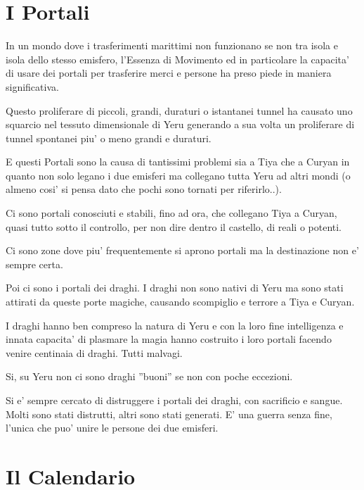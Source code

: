 \documentclass[a4paper,11pt,twoside,openany]{book}
\begin{document}
{		\pagebreak
		
		\section{I Portali}
		
		\label{i-portali}
		
		In un mondo dove i trasferimenti marittimi non funzionano se non tra isola e isola dello stesso emisfero, l'Essenza di Movimento ed in particolare la capacita' di usare dei portali per trasferire merci e persone ha preso piede in maniera significativa.
		
		Questo proliferare di piccoli, grandi, duraturi o istantanei tunnel ha causato uno squarcio nel tessuto dimensionale di Yeru generando a sua volta un proliferare di tunnel spontanei piu' o meno grandi e duraturi.
		
		E questi Portali sono la causa di tantissimi problemi sia a Tiya che a Curyan in quanto non solo legano i due emisferi ma collegano tutta Yeru ad altri mondi (o almeno cosi' si pensa dato che pochi sono tornati per riferirlo..).
		
		Ci sono portali conosciuti e stabili, fino ad ora, che collegano Tiya a Curyan, quasi tutto sotto il controllo, per non dire dentro il castello, di reali o potenti.
		
		Ci sono zone dove piu' frequentemente si aprono portali ma la destinazione non e' sempre certa.
		
		Poi ci sono i portali dei draghi. I draghi non sono nativi di Yeru ma sono stati attirati da queste porte magiche, causando scompiglio e terrore a Tiya e Curyan.
		
		I draghi hanno ben compreso la natura di Yeru e con la loro fine intelligenza e innata capacita' di plasmare la magia hanno costruito i loro portali facendo venire centinaia di draghi. Tutti malvagi.
		
		Si, su Yeru non ci sono draghi ''buoni'' se non con poche eccezioni.
		
		Si e' sempre cercato di distruggere i portali dei draghi, con sacrificio e sangue. Molti sono stati distrutti, altri sono stati generati. E' una guerra senza fine, l'unica che puo' unire le persone dei due emisferi. 
		
		\pagebreak
		
		\section{Il Calendario}
		
}
\end{document}

